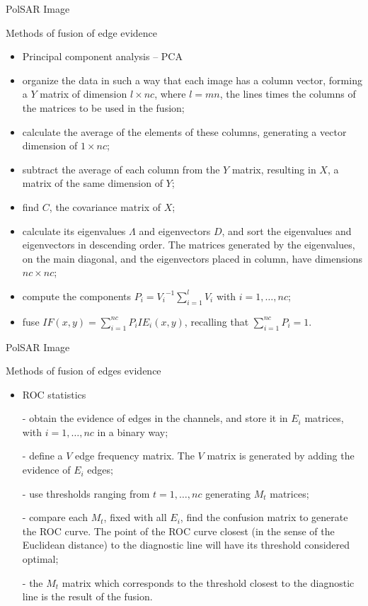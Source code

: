 \documentclass[10pt]{beamer}
\begin{document}
\begin{frame}[fragile]{PolSAR Image}
\begin{alertblock}{Methods of fusion of edge evidence}
\begin{itemize}
	\item Principal component analysis -- PCA
	\item organize the data in such a way that each image has a column vector, forming a $Y$ matrix of dimension $l\times nc$, where $l=m n$, the lines times the columns of the matrices to be used in the fusion;
\item calculate the average of the elements of these columns, generating a vector dimension of $1\times nc$;
\item subtract the average of each column from the $Y$ matrix, resulting in $X$, a matrix of the same dimension of $Y$; 
\item find $C$, the covariance matrix of $X$;
\item calculate its eigenvalues $\Lambda$ and eigenvectors $D$, and sort the eigenvalues and eigenvectors in descending order. The matrices generated by the eigenvalues, on the main diagonal, and the eigenvectors placed in column, have dimensions $nc\times nc$;
\item compute the components $P_i={V_i}^{-1}{\sum_{i=1}^l V_i}$ with $i=1,\dots,nc$;
\item fuse $IF(x,y)=\sum_{i=1}^{nc}P_iIE_i(x,y)$, recalling that $\sum_{i=1}^{nc}P_i=1$.
\end{itemize}
\end{alertblock}
\end{frame}


\begin{frame}[fragile]{PolSAR Image}
\begin{alertblock}{Methods of fusion of edges evidence}
\begin{itemize}
	\item ROC statistics
	\item[-] obtain the evidence of edges in the channels, and store it in $E_i$ matrices, with $i=1,\dots,nc$ in a binary way;
\item[-] define a $V$ edge frequency matrix. The $V$ matrix is generated by adding the evidence of $E_i$ edges;
\item[-] use thresholds ranging from $t=1,\dots,nc$ generating $M_t$ matrices;
\item[-] compare each $M_t$, fixed with all $E_i$, find the confusion matrix to generate the ROC curve. The point of the ROC curve closest (in the sense of the Euclidean distance) to the diagnostic line will have its threshold considered optimal;
\item[-] the $M_t$ matrix which corresponds to the threshold closest to the diagnostic line is the result of the fusion.
\end{itemize}
\end{alertblock}
\end{frame}
\end{document}
